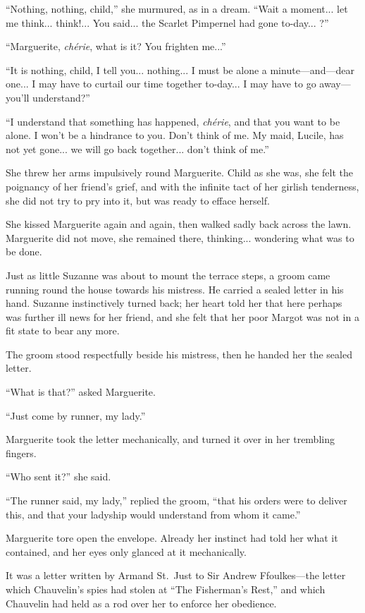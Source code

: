 \documentclass[paper=5.5in:8.5in,BCOR=7mm,twoside,DIV=calc,12pt,usegeometry,chapterprefix,endperiod,headings=big]{scrbook}
\begin{document}
\enquote{Nothing, nothing, child,} she murmured, as in a dream. \enquote{Wait a moment... let me think... think!... You said... the Scarlet Pimpernel had gone to-day... ?}

\enquote{Marguerite, \textit{chérie}, what is it? You frighten me...}

\enquote{It is nothing, child, I tell you... nothing... I must be alone a minute---and---dear one... I may have to curtail our time together to-day... I may have to go away---you'll understand?}

\enquote{I understand that something has happened, \textit{chérie}, and that you want to be alone. I won't be a hindrance to you. Don't think of me. My maid, Lucile, has not yet gone... we will go back together... don't think of me.}

She threw her arms impulsively round Marguerite. Child as she was, she felt the poignancy of her friend's grief, and with the infinite tact of her girlish tenderness, she did not try to pry into it, but was ready to efface herself.

She kissed Marguerite again and again, then walked sadly back across the lawn. Marguerite did not move, she remained there, thinking... wondering what was to be done.

Just as little Suzanne was about to mount the terrace steps, a groom came running round the house towards his mistress. He carried a sealed letter in his hand. Suzanne instinctively turned back; her heart told her that here perhaps was further ill news for her friend, and she felt that her poor Margot was not in a fit state to bear any more.

The groom stood respectfully beside his mistress, then he handed her the sealed letter.

\enquote{What is that?} asked Marguerite.

\enquote{Just come by runner, my lady.}

Marguerite took the letter mechanically, and turned it over in her trembling fingers.

\enquote{Who sent it?} she said.

\enquote{The runner said, my lady,} replied the groom, \enquote{that his orders were to deliver this, and that your ladyship would understand from whom it came.}

Marguerite tore open the envelope. Already her instinct had told her what it contained, and her eyes only glanced at it mechanically.

It was a letter written by Armand St.~Just to Sir Andrew Ffoulkes---the letter which Chauvelin's spies had stolen at \enquote{The Fisherman's Rest,} and which Chauvelin had held as a rod over her to enforce her obedience.
\end{document}
